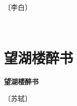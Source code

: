 \documentclass[12pt,UTF-8,openany,fontset=none]{ctexbook}
\begin{document}
\begin{center}
    \vspace{10pt}
    
    \begin{large}
        
        〔李白〕
        
    \end{large}
    
    \vspace{8pt}
    
    \begin{huge}
        
        \phantom{。}~~

        \phantom{。}
        
        \phantom{。}

        \hspace{0.7em}  {}
        
    \end{huge}
    
\end{center}

\vspace{8pt}
\clearpage


\section{望湖楼醉书}



\begin{center}
    {\bfseries 望湖楼醉书}
\end{center}

\begin{center}
    \vspace{10pt}
    
    \begin{large}
        
        〔苏轼〕
        
    \end{large}
    
    \vspace{8pt}
    
    \begin{huge}
        
        \phantom{。}

        \phantom{。}
        
        \phantom{。}

        \phantom{。}
        
    \end{huge}
    
\end{center}
\end{document}
